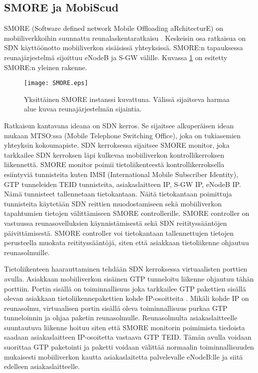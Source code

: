 
\subsection{SMORE ja MobiScud} \label{smore}
SMORE (Software defined network Mobile Offloading aRchitecturE) on mobiiliverkkoihin suunnattu reunalaskentaratkaisu \cite{cho2014smore}.
Keskeisin osa ratkaisua on SDN käyttöönotto mobiiliverkon sisäisissä yhteyksissä.
SMORE:n tapauksessa reunajärjestelmä sijoittuu eNodeB ja S-GW välille. Kuvassa \ref{fig:smore} on esitetty SMORE:n yleinen rakenne.

\begin{figure}[tb]
\texttt{[image: SMORE.eps]}
\caption{Yksittäinen SMORE instanssi kuvattuna. Välissä sijaitseva harmaa alue kuvaa reunajärjestelmän sijaintia.} \label{fig:smore}
\end{figure}


Ratkaisun kantavana ideana on SDN kerros. Se sijaitsee alkuperäisen idean mukaan MTSO:ssa (Mobile Telephone Switching Office), joka on tukiasemien yhteyksin kokoumapiste.
SDN kerroksessa sijaitsee SMORE monitor, joka tarkkailee SDN kerroksen läpi kulkevaa mobiiliverkon kontrollikerroksen liikennettä. SMORE monitor poimii tietoliikenteestä kontrollikerroksella esiintyviä tunnisteita kuten IMSI (International Mobile Subscriber Identity), GTP tunneleiden TEID tunnisteita, asiakaslaitteen IP, S-GW IP, eNodeB IP. Nämä tunnisteet tallennetaan tietokantaan.
Näitä tietokantaan poimittuja tunnisteita käytetään SDN reittien muodostamiseen sekä mobiiliverkon tapahtumien tietojen välittämiseen SMORE controllerille.
SMORE controller on vastuussa reunasovelluksien käynnistämisestä sekä SDN reitityssääntöjen päivittämisestä. SMORE controller voi tietokantaan tallennettujen tietojen perusteella muokata reitityssääntöjä, siten että asiakkaan tietoliikenne ohjautuu reunasolmuille. 

Tietoliikenteen haarauttaminen tehdään SDN kerroksessa virtuaalisten porttien avulla.
Asiakkaan mobiiliverkon sisäinen GTP tunneloitu liikenne ohjautuu tähän porttiin.
Portin sisällä on toiminnallisuus joka tarkkailee GTP pakettien sisällä olevan asiakkaan tietoliikennepakettien kohde IP-osoitteita \cite{cho2014smore}.
Mikäli kohde IP on reunasolmu, virtuaalisen portin sisällä oleva toiminnallisuus purkaa GTP tunneloinnin ja ohjaa paketin reunasolmulle.
Reunasolmulta asiakaslaitteelle suuntautuva liikenne hoituu siten että SMORE monitorin poimimista tiedoista saadaan asiakaslaitteen IP-osoitetta vastaava GTP TEID.
Tämän avulla voidaan suorittaa GTP paketointi ja paketti voidaan välittää normaalin toiminnallisuuden mukaisesti mobiiliverkon kautta asiakaslaitetta palvelevalle eNodeB:lle ja siitä edelleen asiakaslaitteelle. 

